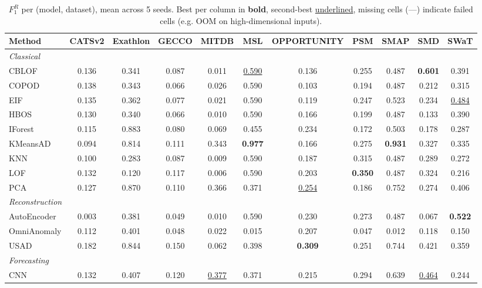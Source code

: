 \begin{table}[t]
\centering
\small
\caption{$F_1^{R}$ per (model, dataset), mean across 5 seeds. Best per column in \textbf{bold}, second-best \underline{underlined}, missing cells (---) indicate failed cells (e.g. OOM on high-dimensional inputs).}
\label{tab:by-dataset-r-based-f1}
\begin{tabular}{lcccccccccc}
\toprule
Method & CATSv2 & Exathlon & GECCO & MITDB & MSL & OPPORTUNITY & PSM & SMAP & SMD & SWaT \\
\midrule
\multicolumn{11}{l}{\textit{Classical}} \\
CBLOF & 0.136 & 0.341 & 0.087 & 0.011 & \underline{0.590} & 0.136 & 0.255 & 0.487 & \textbf{0.601} & 0.391 \\
COPOD & 0.138 & 0.343 & 0.066 & 0.026 & 0.590 & 0.103 & 0.194 & 0.487 & 0.212 & 0.315 \\
EIF & 0.135 & 0.362 & 0.077 & 0.021 & 0.590 & 0.119 & 0.247 & 0.523 & 0.234 & \underline{0.484} \\
HBOS & 0.130 & 0.340 & 0.066 & 0.010 & 0.590 & 0.166 & 0.199 & 0.487 & 0.133 & 0.390 \\
IForest & 0.115 & 0.883 & 0.080 & 0.069 & 0.455 & 0.234 & 0.172 & 0.503 & 0.178 & 0.287 \\
KMeansAD & 0.094 & 0.814 & 0.111 & 0.343 & \textbf{0.977} & 0.166 & 0.275 & \textbf{0.931} & 0.327 & 0.335 \\
KNN & 0.100 & 0.283 & 0.087 & 0.009 & 0.590 & 0.187 & 0.315 & 0.487 & 0.289 & 0.272 \\
LOF & 0.132 & 0.120 & 0.117 & 0.006 & 0.590 & 0.203 & \textbf{0.350} & 0.487 & 0.324 & 0.216 \\
PCA & 0.127 & 0.870 & 0.110 & 0.366 & 0.371 & \underline{0.254} & 0.186 & 0.752 & 0.274 & 0.406 \\
\midrule
\multicolumn{11}{l}{\textit{Reconstruction}} \\
AutoEncoder & 0.003 & 0.381 & 0.049 & 0.010 & 0.590 & 0.230 & 0.273 & 0.487 & 0.067 & \textbf{0.522} \\
OmniAnomaly & 0.112 & 0.401 & 0.048 & 0.022 & 0.015 & 0.207 & 0.047 & 0.012 & 0.118 & 0.150 \\
USAD & 0.182 & 0.844 & 0.150 & 0.062 & 0.398 & \textbf{0.309} & 0.251 & 0.744 & 0.421 & 0.359 \\
\midrule
\multicolumn{11}{l}{\textit{Forecasting}} \\
CNN & 0.132 & 0.407 & 0.120 & \underline{0.377} & 0.371 & 0.215 & 0.294 & 0.639 & \underline{0.464} & 0.244 \\

\end{tabular}
\end{table}

